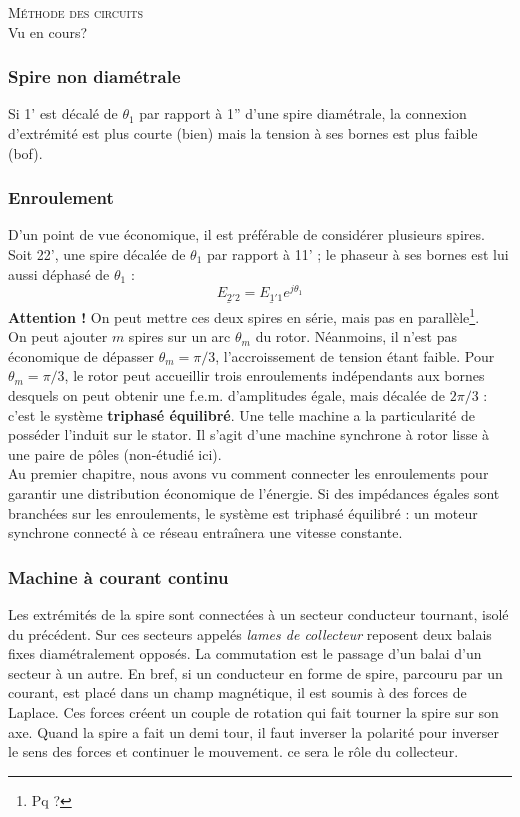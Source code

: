 		\textsc{Méthode des circuits}\\
		Vu en cours?
		
		
		\subsubsection{Spire non diamétrale}
		Si 1' est décalé de $\theta_1$ par rapport à 1'' d'une spire 
		diamétrale, la connexion d'extrémité est plus courte (bien) 
		mais la tension à ses bornes est plus faible (bof).
		
		\subsubsection{Enroulement}
		D'un point de vue économique, il est préférable de considérer 
		plusieurs spires. Soit 22', une spire décalée de $\theta_1$ 
		par rapport à 11' ; le phaseur à ses bornes est lui aussi 
		déphasé de $\theta_1$ :
		\begin{equation}
		\underline{E_{2'2}} = \underline{E_{1'1}}e^{j\theta_1}
		\end{equation}
		\textbf{Attention !} On peut mettre ces deux spires en série, 
		mais pas en parallèle\footnote{Pq ?}.\\
		
		On peut ajouter $m$ spires sur un arc $\theta_m$ du rotor. 
		Néanmoins, 	il n'est pas économique de dépasser $\theta_m = 
		\pi/3$, l'accroissement de tension étant faible. Pour $\theta_m = 
		\pi/3$, le rotor peut accueillir trois enroulements indépendants 
		aux bornes desquels on peut obtenir une f.e.m. d'amplitudes 
		égale, mais décalée de $2\pi/3$ : c'est le système \textbf{triphasé 
		équilibré}. Une telle machine a la particularité de posséder l'induit sur 
		le stator. Il s'agit d'une machine synchrone à rotor lisse à 
		une paire de pôles (non-étudié ici).\\
		
		Au premier chapitre, nous avons vu comment connecter les enroulements 
		pour garantir une distribution économique de l'énergie. Si des 
		impédances égales sont branchées sur les enroulements, le système 
		est triphasé équilibré : un moteur synchrone connecté à ce réseau 
		entraînera une vitesse constante.
		
		
		\subsubsection{Machine à courant continu}
		Les extrémités de la spire sont connectées à un secteur conducteur 
		tournant, isolé du précédent. Sur ces secteurs appelés \textit{lames 
		de collecteur} reposent deux balais fixes diamétralement opposés. La 
		commutation est le passage d'un balai d'un secteur à un autre. En bref, 
		si un conducteur en forme de spire, parcouru par un courant, est placé
		dans un champ magnétique, il est soumis à des forces de Laplace. Ces forces 
		créent un couple de rotation qui fait tourner la spire sur son axe. Quand 
		la spire a fait un demi tour, il faut inverser la polarité pour inverser le 
		sens des forces et continuer le mouvement. ce sera le rôle du collecteur.
		
